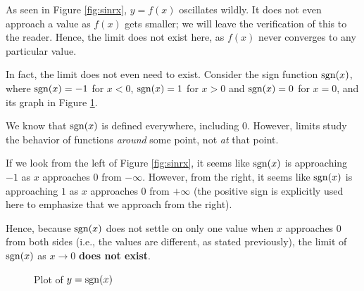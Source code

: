 As seen in Figure \ref{fig:sinrx}, $y = f(x)$ oscillates wildly. It does not even approach a value as $f(x)$ gets smaller; we will leave
the verification of this to the reader. Hence, the limit does not exist here, as $f(x)$ never converges to any
particular value.

In fact, the limit does not even need to exist. Consider the sign function $\operatorname{sgn}(x)$, where
$\operatorname{sgn}(x) = -1$ for $x < 0$, $\operatorname{sgn}(x) = 1$ for $x > 0$ and $\operatorname{sgn}(x) = 0$ for $x = 0$, and its
graph in Figure \ref{fig:sgn}.

We know that $\operatorname{sgn}(x)$ is defined everywhere, including $0$. However, limits study the behavior of
functions \textit{around} some point, not \textit{at} that point.

If we look from the left of Figure \ref{fig:sinrx}, it seems like $\operatorname{sgn}(x)$ is approaching $-1$ as $x$ approaches $0$ from
$-\infty$. However, from the right, it seems like $\operatorname{sgn}(x)$ is approaching $1$ as $x$ approaches $0$
from $+\infty$ (the positive sign is explicitly used here to emphasize that we approach from the right).

Hence, because $\operatorname{sgn}(x)$ does not settle on only one value when $x$ approaches $0$ from both sides
(i.e., the values are different, as stated previously), the limit of $\operatorname{sgn}(x)$ as $x \to 0$ \textbf{does
not exist}.

\begin{figure}[h]
    \centering
    \caption{Plot of $y = \operatorname{sgn}(x)$}
    \label{fig:sgn}
\end{figure}

